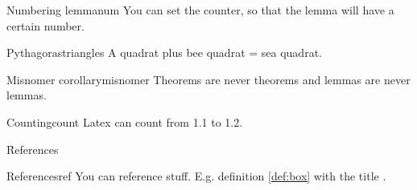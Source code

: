\begin{multicols*}{3}
  \begin{lemma}{Numbering lemma}{num}
    You can set the counter, so that the lemma will have a certain number.
  \end{lemma}

  \begin{satz}{Pythagoras}{triangles}
    A quadrat plus bee quadrat = sea quadrat.
  \end{satz}

  \begin{theorem}{Misnomer corollary}{misnomer}
    Theorems are never theorems and lemmas are never lemmas.
  \end{theorem}


  \begin{axiom}{Counting}{count}
    Latex can count from 1.1 to 1.2.
  \end{axiom}

  \h{References}

  \begin{corollary}{References}{ref}
    You can reference stuff. E.g. definition \ref{def:box} with the title .
  \end{corollary}

\end{multicols*}


